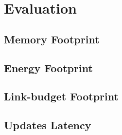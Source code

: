 \section{Evaluation}
\label{sec:evaluation}

\subsection{Memory Footprint}
\subsection{Energy Footprint}
\subsection{Link-budget Footprint}
\subsection{Updates Latency}

